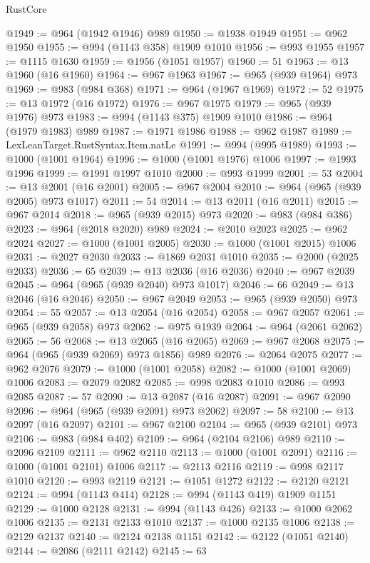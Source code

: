 \begin{lexlean}{RustCore}
\begin{coremodule}
@1949 := @964 (@1942 @1946) @989
@1950 := @1938 @1949
@1951 := @962 @1950
@1955 := @994 (@1143 @358) @1909 @1010
@1956 := @993 @1955
@1957 := @1115 @1630
@1959 := @1956 (@1051 @1957)
@1960 := 51
@1963 := @13 @1960 (@16 @1960)
@1964 := @967 @1963
@1967 := @965 (@939 @1964) @973
@1969 := @983 (@984 @368)
@1971 := @964 (@1967 @1969)
@1972 := 52
@1975 := @13 @1972 (@16 @1972)
@1976 := @967 @1975
@1979 := @965 (@939 @1976) @973
@1983 := @994 (@1143 @375) @1909 @1010
@1986 := @964 (@1979 @1983) @989
@1987 := @1971 @1986
@1988 := @962 @1987
@1989 := LexLeanTarget.RustSyntax.Item.natLe
@1991 := @994 (@995 @1989)
@1993 := @1000 (@1001 @1964)
@1996 := @1000 (@1001 @1976) @1006
@1997 := @1993 @1996
@1999 := @1991 @1997 @1010
@2000 := @993 @1999
@2001 := 53
@2004 := @13 @2001 (@16 @2001)
@2005 := @967 @2004
@2010 := @964 (@965 (@939 @2005) @973 @1017)
@2011 := 54
@2014 := @13 @2011 (@16 @2011)
@2015 := @967 @2014
@2018 := @965 (@939 @2015) @973
@2020 := @983 (@984 @386)
@2023 := @964 (@2018 @2020) @989
@2024 := @2010 @2023
@2025 := @962 @2024
@2027 := @1000 (@1001 @2005)
@2030 := @1000 (@1001 @2015) @1006
@2031 := @2027 @2030
@2033 := @1869 @2031 @1010
@2035 := @2000 (@2025 @2033)
@2036 := 65
@2039 := @13 @2036 (@16 @2036)
@2040 := @967 @2039
@2045 := @964 (@965 (@939 @2040) @973 @1017)
@2046 := 66
@2049 := @13 @2046 (@16 @2046)
@2050 := @967 @2049
@2053 := @965 (@939 @2050) @973
@2054 := 55
@2057 := @13 @2054 (@16 @2054)
@2058 := @967 @2057
@2061 := @965 (@939 @2058) @973
@2062 := @975 @1939
@2064 := @964 (@2061 @2062)
@2065 := 56
@2068 := @13 @2065 (@16 @2065)
@2069 := @967 @2068
@2075 := @964 (@965 (@939 @2069) @973 @1856) @989
@2076 := @2064 @2075
@2077 := @962 @2076
@2079 := @1000 (@1001 @2058)
@2082 := @1000 (@1001 @2069) @1006
@2083 := @2079 @2082
@2085 := @998 @2083 @1010
@2086 := @993 @2085
@2087 := 57
@2090 := @13 @2087 (@16 @2087)
@2091 := @967 @2090
@2096 := @964 (@965 (@939 @2091) @973 @2062)
@2097 := 58
@2100 := @13 @2097 (@16 @2097)
@2101 := @967 @2100
@2104 := @965 (@939 @2101) @973
@2106 := @983 (@984 @402)
@2109 := @964 (@2104 @2106) @989
@2110 := @2096 @2109
@2111 := @962 @2110
@2113 := @1000 (@1001 @2091)
@2116 := @1000 (@1001 @2101) @1006
@2117 := @2113 @2116
@2119 := @998 @2117 @1010
@2120 := @993 @2119
@2121 := @1051 @1272
@2122 := @2120 @2121
@2124 := @994 (@1143 @414)
@2128 := @994 (@1143 @419) @1909 @1151
@2129 := @1000 @2128
@2131 := @994 (@1143 @426)
@2133 := @1000 @2062 @1006
@2135 := @2131 @2133 @1010
@2137 := @1000 @2135 @1006
@2138 := @2129 @2137
@2140 := @2124 @2138 @1151
@2142 := @2122 (@1051 @2140)
@2144 := @2086 (@2111 @2142)
@2145 := 63

\end{coremodule}
\end{lexlean}
